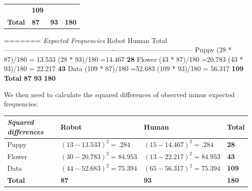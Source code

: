\documentclass[
]{book}
\begin{document}
\begin{longtable}[]{@{}llll@{}}
\begin{minipage}[t]{0.27\columnwidth}
\end{minipage} & \begin{minipage}[t]{0.10\columnwidth}\raggedright
\textbf{109}\strut
\end{minipage}\tabularnewline
\begin{minipage}[t]{0.24\columnwidth}\raggedright
\textbf{Total}\strut
\end{minipage} & \begin{minipage}[t]{0.27\columnwidth}\raggedright
\textbf{87}\strut
\end{minipage} & \begin{minipage}[t]{0.27\columnwidth}\raggedright
\textbf{93}\strut
\end{minipage} & \begin{minipage}[t]{0.10\columnwidth}\raggedright
\textbf{180}\strut
\end{minipage}\tabularnewline
\bottomrule
\end{longtable}

=======
\textbar{} \emph{Expected Frequencies} \textbar{} Robot \textbar{} Human \textbar{} Total \textbar{}
\textbar------------------------\textbar-------------------------\textbar--------------------------\textbar---------\textbar{}
\textbar{} Puppy \textbar{} (28 * 87)/180 = 13.533 \textbar{} (28 * 93)/180 =14.467 \textbar{} \textbf{28} \textbar{}
\textbar{} Flower \textbar{} (43 * 87)/180 =20.783 \textbar{} (43 * 93)/180 = 22.217 \textbar{} \textbf{43} \textbar{}
\textbar{} Data \textbar{} (109 * 87)/180 =52.683 \textbar{} (109 * 93)/180 = 56.317 \textbar{} \textbf{109} \textbar{}
\textbar{} \textbf{Total} \textbar{} \textbf{87} \textbar{} \textbf{93} \textbar{} \textbf{180} \textbar{}

We then need to calculate the squared differences of observed minus expected frequencies:

\begin{longtable}[]{@{}llll@{}}
\toprule
\emph{Squared differences} & Robot & Human & Total\tabularnewline
\midrule
\endhead
Puppy & \((13-13.533)^2 = .284\) & \((15-14.467)^2 = .284\) & \textbf{28}\tabularnewline
Flower & \((30-20.783)^2 = 84.953\) & \((13-22.217)^2 = 84.953\) & \textbf{43}\tabularnewline
Data & \((44-52.683)^2 = 75.394\) & \((65-56.317)^2 = 75.394\) & \textbf{109}\tabularnewline
\textbf{Total} & \textbf{87} & \textbf{93} & \textbf{180}\tabularnewline
\bottomrule
\end{longtable}
\end{document}
